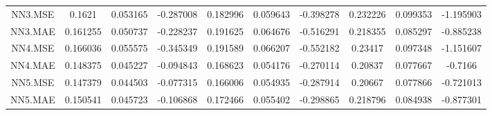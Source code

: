 \begin{longtable}{cccccccccc}
\addlinespace
NN3.MSE & 0.1621 & 0.053165 & -0.287008 & 0.182996 & 0.059643 & -0.398278 & 0.232226 & 0.099353 & -1.195903\\
NN3.MAE & 0.161255 & 0.050737 & -0.228237 & 0.191625 & 0.064676 & -0.516291 & 0.218355 & 0.085297 & -0.885238\\
NN4.MSE & 0.166036 & 0.055575 & -0.345349 & 0.191589 & 0.066207 & -0.552182 & 0.23417 & 0.097348 & -1.151607\\
NN4.MAE & 0.148375 & 0.045227 & -0.094843 & 0.168623 & 0.054176 & -0.270114 & 0.20837 & 0.077667 & -0.7166\\
NN5.MSE & 0.147379 & 0.044503 & -0.077315 & 0.166006 & 0.054935 & -0.287914 & 0.20667 & 0.077866 & -0.721013\\
\addlinespace
NN5.MAE & 0.150541 & 0.045723 & -0.106868 & 0.172466 & 0.055402 & -0.298865 & 0.218796 & 0.084938 & -0.877301\\*
\end{longtable}
\endgroup{}